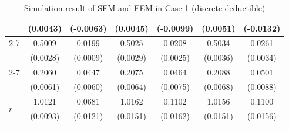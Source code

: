 \begin{table}[!ht]
{{\begin{minipage}{0.65\textwidth}
\begin{tabular}{lcccccc}
         & (0.0043) & (-0.0063) & (0.0045) & (-0.0099) & (0.0051) & (-0.0132) \\
        \cmidrule{2-7}
         & 0.5009 & 0.0199 & 0.5025 & 0.0208 & 0.5034 & 0.0261 \\
         & (0.0028) & (0.0009) & (0.0029) & (0.0025) & (0.0036) & (0.0034) \\
        \cmidrule{2-7}
         & 0.2060 & 0.0447 & 0.2075 & 0.0464 & 0.2088 & 0.0501 \\
         & (0.0061) & (0.0060) & (0.0064) & (0.0075) & (0.0068) & (0.0088) \\
        \midrule
        \multirow{2}{*}{$r$} & 1.0121 & 0.0681 & 1.0162 & 0.1102 & 1.0156 & 0.1100 \\
         & (0.0093) & (0.0121) & (0.0151) & (0.0162) & (0.0151) & (0.0156) \\
        \hhline{=======}
        \end{tabular}
    \end{minipage}
}
}
\caption{Simulation result of SEM and FEM in Case 1 (discrete deductible)}\label{tab:AppSimExoCase1}
\end{table}
